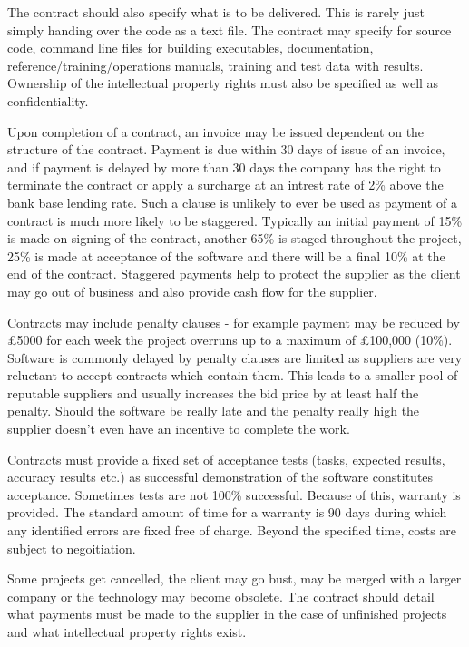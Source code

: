 \documentclass{article}
\begin{document}
	\par 
	The contract should also specify what is to be delivered. This is rarely just simply handing over the code as a text file. The contract may specify for source code, command line files for building executables, documentation, reference/training/operations manuals, training and test data with results. Ownership of the intellectual property rights must also be specified as well as confidentiality.
	
	\par 
	Upon completion of a contract, an invoice may be issued dependent on the structure of the contract. Payment is due within 30 days of issue of an invoice, and if payment is delayed by more than 30 days the company has the right to terminate the contract or apply a surcharge at an intrest rate of 2\% above the bank base lending rate. Such a clause is unlikely to ever be used as payment of a contract is much more likely to be staggered. Typically an initial payment of 15\% is made on signing of the contract, another 65\% is staged throughout the project, 25\% is made at acceptance of the software and there will be a final 10\% at the end of the contract. Staggered payments help to protect the supplier as the client may go out of business and also provide cash flow for the supplier.
	
	\par 
	Contracts may include penalty clauses - for example payment may be reduced by £5000 for each week the project overruns up to a maximum of £100,000 (10\%). Software is commonly delayed by penalty clauses are limited as suppliers are very reluctant to accept contracts which contain them. This leads to a smaller pool of reputable suppliers and usually increases the bid price by at least half the penalty. Should the software be really late and the penalty really high the supplier doesn't even have an incentive to complete the work.
	
	Contracts must provide a fixed set of acceptance tests (tasks, expected results, accuracy results etc.) as successful demonstration of the software constitutes acceptance. Sometimes tests are not 100\% successful. Because of this, warranty is provided. The standard amount of time for a warranty is 90 days during which any identified errors are fixed free of charge. Beyond the specified time, costs are subject to negoitiation. 
	
	\par 
	Some projects get cancelled, the client may go bust, may be merged with a larger company or the technology may become obsolete. The contract should detail what payments must be made to the supplier in the case of unfinished projects and what intellectual property rights exist.
	
\end{document}
